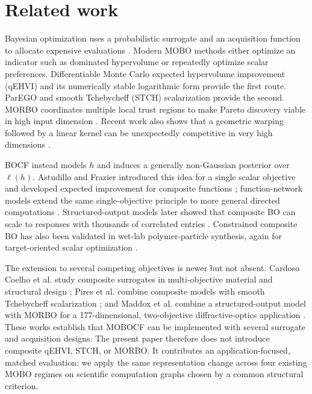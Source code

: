 \documentclass{article}
\newcommand{\composemap}{\ell}
\begin{document}
\section{Related work}
\label{sec:related}

Bayesian optimization uses a probabilistic surrogate and an acquisition
function to allocate expensive evaluations \cite{shahriari2016taking,frazier2018tutorial}.
Modern MOBO methods either optimize an indicator such as dominated hypervolume
or repeatedly optimize scalar preferences.  Differentiable Monte Carlo
expected hypervolume improvement (qEHVI) \cite{daulton2020differentiable} and
its numerically stable logarithmic form \cite{ament2023unexpected} provide the
first route.  ParEGO \cite{knowles2006parego} and smooth Tchebycheff (STCH)
scalarization \cite{lin2024smooth} provide the second.  MORBO coordinates
multiple local trust regions to make Pareto discovery viable in high input
dimension \cite{daulton2022morbo}.  Recent work also shows that a geometric
warping followed by a linear kernel can be unexpectedly competitive in very
high dimensions \cite{doumont2026linear}.

BOCF instead models $h$ and induces a generally non-Gaussian posterior over
$\composemap(h)$.  Astudillo and Frazier introduced this idea for a single
scalar objective and developed expected improvement for composite functions
\cite{astudillo2019bayesian}; function-network models extend the same
single-objective principle to more general directed computations
\cite{astudillo2021networks}.  Structured-output models later showed that
composite BO can scale to responses with thousands of correlated entries
\cite{maddox2021outputs}.  Constrained composite BO has also been validated in
wet-lab polymer-particle synthesis, again for target-oriented scalar
optimization \cite{wang2025constrained}.

The extension to several competing objectives is newer but not absent.
Cardoso Coelho et al. study composite surrogates in multi-objective material
and structural design \cite{coelho2025composite}; Pires et al. combine
composite models with smooth Tchebycheff scalarization
\cite{pires2026composite}; and Maddox et al. combine a structured-output model
with MORBO for a 177-dimensional, two-objective diffractive-optics application
\cite{maddox2021physics}.  These works establish that MOBOCF can be implemented
with several surrogate and acquisition designs.  The present paper therefore
does not introduce composite qEHVI, STCH, or MORBO.  It contributes an
application-focused, matched evaluation: we apply the same representation
change across four existing MOBO regimes on scientific computation graphs
chosen by a common structural criterion.
\end{document}
